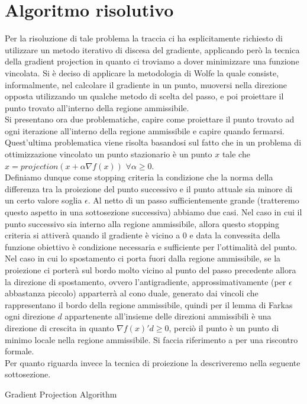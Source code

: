 \documentclass[12pt]{extarticle}
\begin{document}
\section{Algoritmo risolutivo}
Per la risoluzione di tale problema la traccia ci ha esplicitamente richiesto di utilizzare un metodo iterativo di discesa del gradiente, applicando però la tecnica della gradient projection in quanto ci troviamo a dover minimizzare una funzione vincolata. Si è deciso di applicare la metodologia di Wolfe la quale consiste, informalmente, nel calcolare il gradiente in un punto, muoversi nella direzione opposta utilizzando un qualche metodo di scelta del passo, e poi proiettare il punto trovato all'interno della regione ammissibile.\\
Si presentano ora due problematiche, capire come proiettare il punto trovato ad ogni iterazione all'interno della regione ammissibile e capire quando fermarsi.
Quest'ultima problematica viene risolta basandosi sul fatto che in un problema di ottimizzazione vincolato un punto stazionario è un punto $x$ tale che $x = projection(x + \alpha\nabla f(x))$ $\forall \alpha \geq 0$.\\
Definiamo dunque come stopping criteria la condizione che la norma della differenza tra la proiezione del punto successivo e il punto attuale sia minore di un certo valore soglia $\epsilon$. Al netto di un passo sufficientemente grande (tratteremo questo aspetto in una sottosezione successiva) abbiamo due casi. Nel caso in cui il punto successivo sia interno alla regione ammissibile, allora questo stopping criteria si attiverà quando il gradiente è vicino a 0 e data la convessita della funzione obiettivo è condizione necessaria e sufficiente per l'ottimalità del punto. Nel caso in cui lo spostamento ci porta fuori dalla regione ammissibile, se la proiezione ci porterà sul bordo molto vicino al punto del passo precedente allora la direzione di spostamento, ovvero l'antigradiente, approssimativamente (per $\epsilon$ abbastanza piccolo) apparterrà al cono duale, generato dai vincoli che rappresentano il bordo della regione ammissibile, quindi per il lemma di Farkas ogni direzione $d$ appartenente all'insieme delle direzioni ammissibili è una direzione di crescita in quanto $\nabla f(x)'d \geq 0$, perciò il punto è un punto di minimo locale nella regione ammissibile. Si faccia riferimento a \cite{pgm_method} per una riscontro formale.\\
Per quanto riguarda invece la tecnica di proiezione la descriveremo nella seguente sottosezione.
\begin{algorithm}
\caption{Gradient Projection Algorithm}
\end{algorithm}
\end{document}
